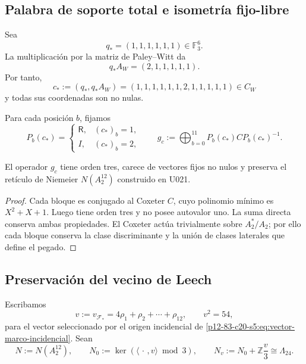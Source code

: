 \subsection{Palabra de soporte total e isometría fijo-libre}

Sea
\[
 q_*=(1,1,1,1,1,1)\in\mathbb F_3^6.
\]
La multiplicación por la matriz de Paley--Witt da
\begin{equation}
 q_*A_W=(2,1,1,1,1,1).
 \label{p12-83-c20-s8:eq:producto-qstar-aw-u031}
\end{equation}
Por tanto,
\begin{equation}
 c_*:=(q_*,q_*A_W)
 =(1,1,1,1,1,1,2,1,1,1,1,1)
 \in C_W
 \label{p12-83-c20-s8:eq:palabra-soporte-total-u031}
\end{equation}
y todas sus coordenadas son no nulas.

Para cada posición \(b\), fijamos
\begin{equation}
 P_b(c_*)=
 \begin{cases}
  \mathsf R,&(c_*)_b=1,\\
  I,&(c_*)_b=2,
 \end{cases}
 \qquad
 g_c:=\bigoplus_{b=0}^{11}P_b(c_*)CP_b(c_*)^{-1}.
 \label{p12-83-c20-s8:eq:isometria-orden-tres-u031}
\end{equation}

\begin{proposition}
\label{p12-83-c20-s8:prop:isometria-fijo-libre-pegado-u031}
El operador \(g_c\) tiene orden tres, carece de vectores fijos no nulos y
preserva el retículo de Niemeier \(N(A_2^{12})\) construido en U021.
\end{proposition}

\begin{proof}
Cada bloque es conjugado al Coxeter \(C\), cuyo polinomio mínimo es
\(X^2+X+1\). Luego tiene orden tres y no posee autovalor uno. La suma
directa conserva ambas propiedades. El Coxeter actúa trivialmente sobre
\(A_2^*/A_2\); por ello cada bloque conserva la clase discriminante y la
unión de clases laterales que define el pegado.
\end{proof}

\subsection{Preservación del vecino de Leech}

Escribamos
\[
 v:=v_{\mathcal F_*}
 =4\rho_1+\rho_2+\cdots+\rho_{12},
 \qquad
 v^2=54,
\]
para el vector seleccionado por el origen incidencial de
\eqref{p12-83-c20-s5:eq:vector-marco-incidencial}. Sean
\[
 N:=N(A_2^{12}),
 \qquad
 N_0:=\ker(\langle\,\cdot\,,v\rangle\bmod3),
 \qquad
 N_v:=N_0+\mathbb Z\frac v3\cong\Lambda_{24}.
\]

